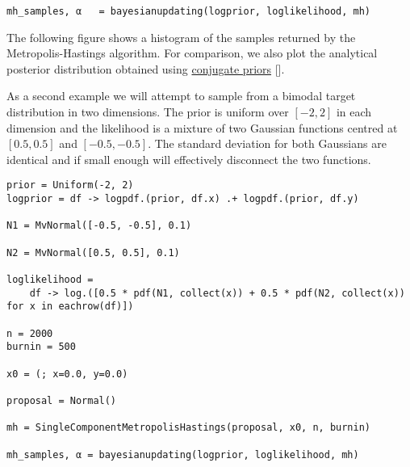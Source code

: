 \begin{verbatim}
mh_samples, α   = bayesianupdating(logprior, loglikelihood, mh)
\end{verbatim}



The following figure shows a histogram of the samples returned by the Metropolis-Hastings algorithm. For comparison, we also plot the analytical posterior distribution obtained using \href{https://en.wikipedia.org/wiki/Conjugate\_prior}{conjugate priors} [].





\begin{figure}
\centering
{}
\caption{}
\end{figure}




As a second example we will attempt to sample from a bimodal target distribution in two dimensions. The prior is uniform over \([-2, 2]\) in each dimension and the likelihood is a mixture of two Gaussian functions centred at \([0.5, 0.5]\) and \([-0.5, -0.5]\).  The standard deviation for both Gaussians are identical and if small enough will effectively disconnect the two functions.




\begin{verbatim}
prior = Uniform(-2, 2)
logprior = df -> logpdf.(prior, df.x) .+ logpdf.(prior, df.y)

N1 = MvNormal([-0.5, -0.5], 0.1)

N2 = MvNormal([0.5, 0.5], 0.1)

loglikelihood =
    df -> log.([0.5 * pdf(N1, collect(x)) + 0.5 * pdf(N2, collect(x)) for x in eachrow(df)])

n = 2000
burnin = 500

x0 = (; x=0.0, y=0.0)

proposal = Normal()

mh = SingleComponentMetropolisHastings(proposal, x0, n, burnin)

mh_samples, α = bayesianupdating(logprior, loglikelihood, mh)
\end{verbatim}



\begin{figure}
\centering
{}
\caption{}
\end{figure}




